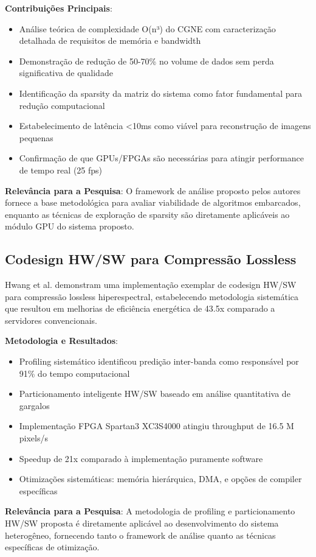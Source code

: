 \textbf{Contribuições Principais}:
\begin{itemize}
\item Análise teórica de complexidade O(n³) do CGNE com caracterização detalhada de requisitos de memória e bandwidth
\item Demonstração de redução de 50-70\% no volume de dados sem perda significativa de qualidade
\item Identificação da sparsity da matriz do sistema como fator fundamental para redução computacional
\item Estabelecimento de latência <10ms como viável para reconstrução de imagens pequenas
\item Confirmação de que GPUs/FPGAs são necessárias para atingir performance de tempo real (25 fps)
\end{itemize}

\textbf{Relevância para a Pesquisa}: O framework de análise proposto pelos autores fornece a base metodológica para avaliar viabilidade de algoritmos embarcados, enquanto as técnicas de exploração de sparsity são diretamente aplicáveis ao módulo GPU do sistema proposto.

\subsection{Codesign HW/SW para Compressão Lossless}

Hwang et al. \cite{hwang2011} demonstram uma implementação exemplar de codesign HW/SW para compressão lossless hiperespectral, estabelecendo metodologia sistemática que resultou em melhorias de eficiência energética de 43.5x comparado a servidores convencionais.

\textbf{Metodologia e Resultados}:
\begin{itemize}
\item Profiling sistemático identificou predição inter-banda como responsável por 91\% do tempo computacional
\item Particionamento inteligente HW/SW baseado em análise quantitativa de gargalos
\item Implementação FPGA Spartan3 XC3S4000 atingiu throughput de 16.5 M pixels/s
\item Speedup de 21x comparado à implementação puramente software
\item Otimizações sistemáticas: memória hierárquica, DMA, e opções de compiler específicas
\end{itemize}

\textbf{Relevância para a Pesquisa}: A metodologia de profiling e particionamento HW/SW proposta é diretamente aplicável ao desenvolvimento do sistema heterogêneo, fornecendo tanto o framework de análise quanto as técnicas específicas de otimização.


